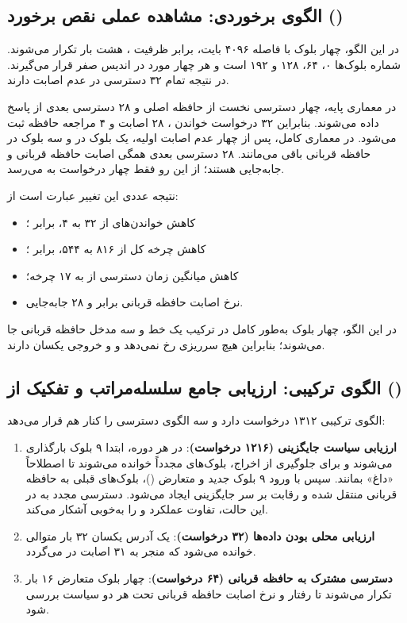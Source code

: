 \documentclass[oneside,a4paper,12pt]{article}
\newcommand{\مهم}[1]{\textbf{#1}}
\newcommand{\درصد}[1]{\lr{#1\%}}
\begin{document}
\subsection{الگوی برخوردی: مشاهده عملی نقص برخورد ()}
\label{subsec:conflict-test}

در این الگو، چهار بلوک با فاصله ۴۰۹۶ بایت، برابر ظرفیت ، هشت بار تکرار می‌شوند. شماره بلوک‌ها ۰، ۶۴، ۱۲۸ و ۱۹۲ است و هر چهار مورد در اندیس صفر  قرار می‌گیرند. در نتیجه تمام ۳۲ دسترسی در  عدم اصابت دارند.

در معماری پایه، چهار دسترسی نخست از حافظه اصلی و ۲۸ دسترسی بعدی از  پاسخ داده می‌شوند. بنابراین ۳۲ درخواست خواندن ، ۲۸ اصابت  و ۴ مراجعه حافظه ثبت می‌شود. در معماری کامل، پس از چهار عدم اصابت اولیه، یک بلوک در  و سه بلوک در حافظه قربانی باقی می‌مانند. ۲۸ دسترسی بعدی همگی اصابت حافظه قربانی و جابه‌جایی هستند؛ از این رو فقط چهار درخواست به  می‌رسد.

نتیجه عددی این تغییر عبارت است از:

\begin{itemize}
\item کاهش خواندن‌های  از ۳۲ به ۴، برابر \درصد{87.5}؛
\item کاهش چرخه کل از ۸۱۶ به ۵۴۴، برابر \درصد{33.33}؛
\item کاهش میانگین زمان دسترسی از  به ۱۷ چرخه؛
\item نرخ اصابت حافظه قربانی برابر \درصد{87.5} و ۲۸ جابه‌جایی.
\end{itemize}

در این الگو، چهار بلوک به‌طور کامل در ترکیب یک خط  و سه مدخل حافظه قربانی جا می‌شوند؛ بنابراین هیچ سرریزی رخ نمی‌دهد و  و  خروجی یکسان دارند.

\subsection{الگوی ترکیبی: ارزیابی جامع سلسله‌مراتب و تفکیک  از  ()}

الگوی ترکیبی ۱۳۱۲ درخواست دارد و سه الگوی دسترسی را کنار هم قرار می‌دهد:

\begin{enumerate}
\item \مهم{ارزیابی سیاست جایگزینی (۱۲۱۶ درخواست)}: در هر دوره، ابتدا ۹ بلوک  بارگذاری می‌شوند و برای جلوگیری از اخراج، بلوک‌های  مجدداً خوانده می‌شوند تا اصطلاحاً «داغ» بمانند. سپس با ورود ۹ بلوک جدید و متعارض ()، بلوک‌های قبلی به حافظه قربانی منتقل شده و رقابت بر سر جایگزینی ایجاد می‌شود. دسترسی مجدد به  در این حالت، تفاوت عملکرد  و  را به‌خوبی آشکار می‌کند.
\item \مهم{ارزیابی محلی بودن داده‌ها (۳۲ درخواست)}: یک آدرس یکسان ۳۲ بار متوالی خوانده می‌شود که منجر به ۳۱ اصابت در  می‌گردد.
\item \مهم{دسترسی مشترک به حافظه قربانی (۶۴ درخواست)}: چهار بلوک متعارض ۱۶ بار تکرار می‌شوند تا رفتار و نرخ اصابت حافظه قربانی تحت هر دو سیاست بررسی شود.
\end{enumerate}
\end{document}
